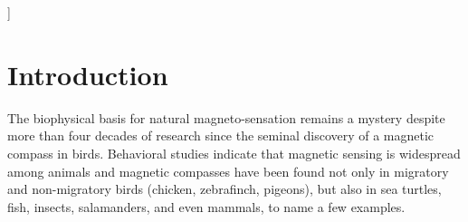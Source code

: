 \documentclass[twoside,twocolumn,9pt]{article}
\begin{document}
  ]

\renewcommand*\rmdefault{bch}\normalfont\upshape
\rmfamily
\section*{}
\vspace{-1cm}





\section{Introduction}
The biophysical basis for natural magneto-sensation remains a mystery despite more than four decades of research since the seminal
discovery of a magnetic compass in birds. \cite{Wiltschko72} Behavioral studies indicate that magnetic sensing is widespread among
animals and magnetic compasses have been found not only in migratory and non-migratory birds (chicken, zebrafinch, pigeons), but
also in sea turtles,\cite{Lohmann1991} fish,\cite{Quinn1980, Walker2006} insects, salamanders, and even mammals, \cite{Begall2013}
to name a few examples.
\end{document}
